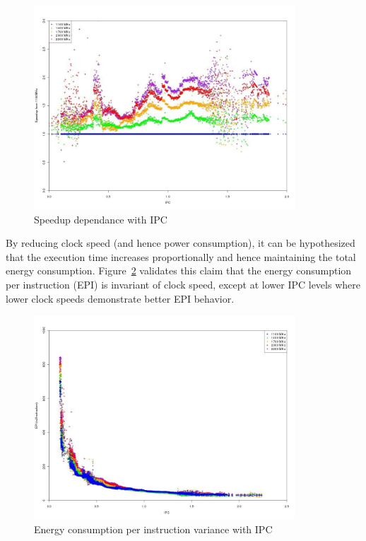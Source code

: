 \begin{figure}[h!]
  \begin{center}
    \includegraphics[height=3in]{figures/ipc_speedup.jpg}%
    \caption{Speedup dependance with IPC}
  \end{center}
  \label{fig:ipc_speedup}
\end{figure}

By reducing clock speed (and hence power consumption), it can be hypothesized that the execution time
increases proportionally and hence maintaining the total energy consumption.
Figure~\ref{fig:ipc_epi} validates this claim that 
the energy consumption per instruction (EPI) is invariant of clock speed, except at lower IPC levels
where lower clock speeds demonstrate better EPI behavior.

\begin{figure}[h!]
  \begin{center}
    \includegraphics[height=3in]{figures/ipc_epi.jpg}%
    \caption{Energy consumption per instruction variance with IPC}
    \label{fig:ipc_epi}
  \end{center}
\end{figure}

